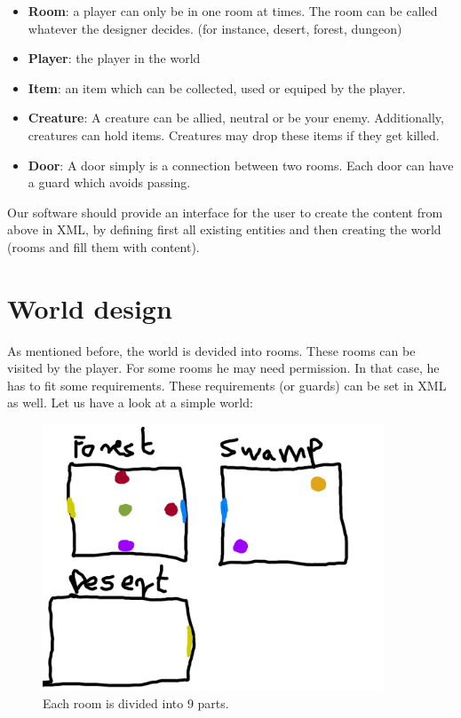 \documentclass[dvips,12pt]{article}
\begin{document}
\begin{itemize}
	\item{\textbf{Room}: a player can only be in one room at times. The room can be called whatever the designer decides. (for instance, desert, forest, dungeon)}
	\item{\textbf{Player}: the player in the world}
	\item{\textbf{Item}: an item which can be collected, used or equiped by the player.}
	\item{\textbf{Creature}: A creature can be allied, neutral or be your enemy. Additionally, creatures can hold items. Creatures may drop these items if they get killed.}
	\item{\textbf{Door}: A door simply is a connection between two rooms. Each door can have a guard which avoids passing.}
\end{itemize}

Our software should provide an interface for the user to create the content from above in XML, by defining first all existing entities and then creating the world (rooms and fill them with content).

\section{World design}

As mentioned before, the world is devided into rooms. These rooms can be visited by the player. For some rooms he may need permission. In that case, he has to fit some requirements. These requirements (or guards) can be set in XML as well. Let us have a look at a simple world:

\begin{figure}[hb]
  \centering
  \includegraphics[width=4in]{../demo/demo.jpg}
  \caption{Each room is divided into 9 parts.}
\end{figure}
\end{document}
